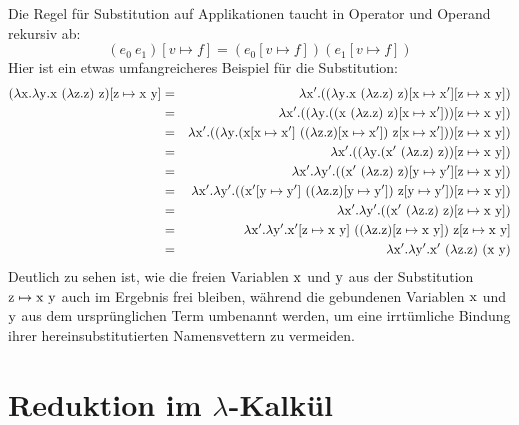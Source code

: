 Die Regel für Substitution auf
Applikationen taucht in Operator und Operand
rekursiv ab:
%
\begin{displaymath}
      (e_0~e_1)[v\mapsto f] = (e_0[v\mapsto f])(e_1[v\mapsto f])
\end{displaymath}
%
Hier ist ein etwas umfangreicheres Beispiel für die Substitution:
%
\begin{eqnarray*}
  (\lambda \mathrm x.\lambda \mathrm y.\mathrm x~(\lambda \mathrm z.\mathrm z)~\mathrm z)[\mathrm z \mapsto \mathrm x~\mathrm y]
  &=&
  \lambda \mathrm x'.((\lambda \mathrm y.\mathrm x~(\lambda \mathrm z.\mathrm z)~\mathrm z)[\mathrm x\mapsto \mathrm x'][\mathrm z \mapsto \mathrm x~\mathrm y])
  \\ &=&
  \lambda \mathrm x'.((\lambda \mathrm y.((\mathrm x~(\lambda \mathrm z.\mathrm z)~\mathrm z)[\mathrm x\mapsto \mathrm x']))[\mathrm z \mapsto \mathrm x~\mathrm y])
  \\ &=&
  \lambda \mathrm x'.((\lambda \mathrm y.(\mathrm x[\mathrm x\mapsto \mathrm x']~((\lambda \mathrm z.\mathrm z)[\mathrm x\mapsto \mathrm x'])~\mathrm z[\mathrm x\mapsto \mathrm x']))[\mathrm z \mapsto \mathrm x~\mathrm y])
  \\ &=&
  \lambda \mathrm x'.((\lambda \mathrm y.(\mathrm x'~(\lambda \mathrm z.\mathrm z)~\mathrm z))[\mathrm z \mapsto \mathrm x~\mathrm y])
  \\ &=&
  \lambda \mathrm x'.\lambda \mathrm y'.((\mathrm x'~(\lambda \mathrm z.\mathrm z)~\mathrm z)[\mathrm y \mapsto \mathrm y'][\mathrm z \mapsto \mathrm x~\mathrm y])
  \\ &=&
  \lambda \mathrm x'.\lambda \mathrm y'.((\mathrm x'[\mathrm y \mapsto \mathrm y']~((\lambda \mathrm z.\mathrm z)[\mathrm y \mapsto \mathrm y'])~\mathrm z[\mathrm y \mapsto \mathrm y'])[\mathrm z \mapsto \mathrm x~\mathrm y])
  \\ &=&
  \lambda \mathrm x'.\lambda \mathrm y'.((\mathrm x'~(\lambda \mathrm z.\mathrm z)~\mathrm z)[\mathrm z \mapsto \mathrm x~\mathrm y])
  \\ &=&
  \lambda \mathrm x'.\lambda \mathrm y'.\mathrm x'[\mathrm z \mapsto \mathrm x~\mathrm y]~((\lambda \mathrm z.\mathrm z)[\mathrm z \mapsto \mathrm x~\mathrm y])~\mathrm z[\mathrm z \mapsto \mathrm x~\mathrm y]
  \\ &=&
  \lambda \mathrm x'.\lambda \mathrm y'.\mathrm x'~(\lambda \mathrm z.\mathrm z)~(\mathrm x~\mathrm y)
\end{eqnarray*}
%
Deutlich zu sehen ist, wie die freien Variablen $\mathrm x$ und $\mathrm y$ aus der
Substitution $\mathrm z\mapsto \mathrm x~\mathrm y$ auch im Ergebnis frei bleiben, während die
gebundenen Variablen $\mathrm x$ und $\mathrm y$ aus dem ursprünglichen Term umbenannt
werden, um eine irrtümliche Bindung ihrer hereinsubstitutierten
Namensvettern zu vermeiden.

\section{Reduktion im $\lambda$-Kalkül}

